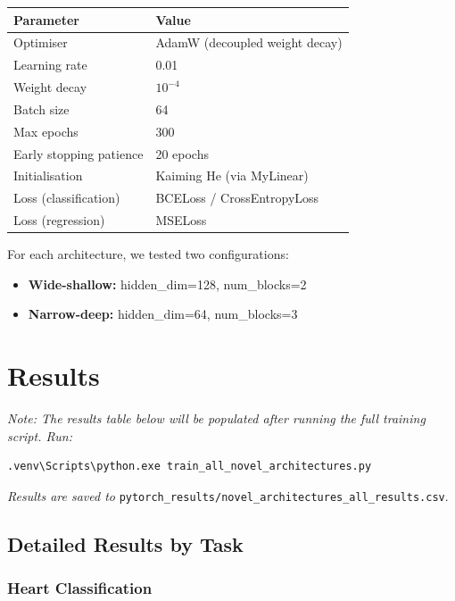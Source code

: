 \documentclass[11pt,a4paper]{article}
\begin{document}
\begin{center}
\small
\begin{tabular}{ll}
\toprule
\textbf{Parameter} & \textbf{Value} \\
\midrule
Optimiser & AdamW (decoupled weight decay) \\
Learning rate & 0.01 \\
Weight decay & $10^{-4}$ \\
Batch size & 64 \\
Max epochs & 300 \\
Early stopping patience & 20 epochs \\
Initialisation & Kaiming He (via MyLinear) \\
Loss (classification) & BCELoss / CrossEntropyLoss \\
Loss (regression) & MSELoss \\
\bottomrule
\end{tabular}
\end{center}

For each architecture, we tested two configurations:
\begin{itemize}[leftmargin=1.2em,itemsep=0.1em]
    \item \textbf{Wide-shallow:} hidden\_dim=128, num\_blocks=2
    \item \textbf{Narrow-deep:} hidden\_dim=64, num\_blocks=3
\end{itemize}

\section{Results}

\textit{Note: The results table below will be populated after running the full training script. Run:}

\begin{verbatim}
.venv\Scripts\python.exe train_all_novel_architectures.py
\end{verbatim}

\textit{Results are saved to} \texttt{pytorch\_results/novel\_architectures\_all\_results.csv}.

\subsection{Detailed Results by Task}

\subsubsection*{Heart Classification}
\end{document}
